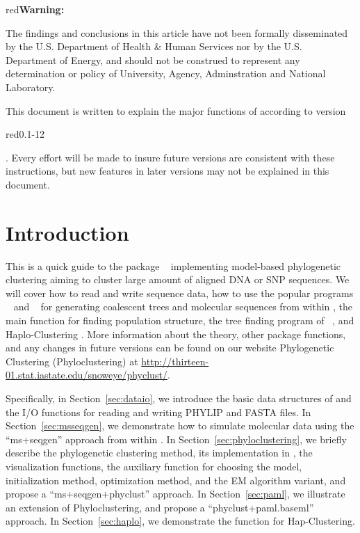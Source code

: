 
\begin{color}{red}\bf Warning:\end{color}
The findings and conclusions in this article have not been
formally disseminated by the U.S. Department of Health \& Human Services
nor by the U.S. Department of Energy,
and should not be construed to represent any determination or
policy of University, Agency, Adminstration and National Laboratory.

This document is written to explain the major functions of 
according to version \begin{color}{red}0.1-12\end{color}.
Every effort will be made to insure future versions are consistent with these
instructions, but new features in later versions may not be explained in this
document.


\section[Introduction]{Introduction}
\label{sec:introduction}

This is a quick guide to the package ~\citep{snoweye2011}
implementing model-based phylogenetic clustering aiming to cluster
large amount of aligned DNA or SNP sequences.
We will cover how to read and write sequence data,
how to use the popular programs ~\citep{Hudson2002} and ~\citep{Rambaut1997} for generating
coalescent trees and molecular sequences from within ,
the main function  for finding population structure,
the tree finding program  of ~\citep{Yang1997,Yang2007},
and Haplo-Clustering \citep{tzeng2005}.
More information about the theory, other package functions,
and any changes in future versions can be found on our website
Phylogenetic Clustering (Phyloclustering) at
\url{http://thirteen-01.stat.iastate.edu/snoweye/phyclust/}.

Specifically, in Section~\ref{sec:dataio}, we introduce the basic data structures
of  and the I/O functions for reading and writing 
PHYLIP and FASTA files. In Section~\ref{sec:msseqgen},
we demonstrate how to simulate molecular data using the ``ms+seqgen'' approach from within .
In Section~\ref{sec:phyloclustering}, we briefly describe
the phylogenetic clustering method, its implementation in , the visualization functions,
the auxiliary function  for choosing the model, initialization method, optimization method,
and the EM algorithm variant, and propose a ``ms+seqgen+phyclust'' approach.
In Section~\ref{sec:paml}, we illustrate an extension of Phyloclustering, and
propose a ``phyclust+paml.baseml'' approach.
In Section~\ref{sec:haplo}, we demonstrate the function
 for Hap-Clustering.



